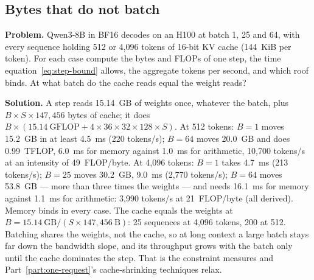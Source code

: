 \subsection{Bytes that do not batch}
\textbf{Problem.} Qwen3-8B in BF16 decodes on an H100 at batch 1, 25 and 64,
with every sequence holding 512 or 4,096 tokens of 16-bit KV cache (144~KiB per
token). For each case compute the bytes and FLOPs of one step, the time
equation~\eqref{eq:step-bound} allows, the aggregate tokens per second, and which
roof binds. At what batch do the cache reads equal the weight reads?

\textbf{Solution.} A step reads 15.14~GB of weights once, whatever the batch,
plus $B \times S \times 147{,}456$ bytes of cache; it does $B \times
(15.14~\text{GFLOP} + 4 \times 36 \times 32 \times 128 \times S)$. At 512 tokens:
$B = 1$ moves 15.2~GB in at least 4.5~ms (220 tokens/s); $B = 64$ moves 20.0~GB
and does 0.99~TFLOP, 6.0~ms for memory against 1.0~ms for arithmetic, 10,700
tokens/s at an intensity of 49~FLOP/byte. At 4,096 tokens: $B = 1$ takes
4.7~ms (213 tokens/s); $B = 25$ moves 30.2~GB, 9.0~ms (2,770 tokens/s); $B = 64$
moves 53.8~GB --- more than three times the weights --- and needs 16.1~ms for
memory against 1.1~ms for arithmetic: 3,990 tokens/s at 21~FLOP/byte (all
derived). Memory binds in every case. The cache equals the weights at
$B = 15.14~\text{GB} / (S \times 147{,}456~\text{B})$: 25 sequences at 4,096
tokens, 200 at 512. Batching shares the weights, not the cache, so at long
context a large batch stays far down the bandwidth slope, and its throughput
grows with the batch only until the cache dominates the step. That is the
constraint  measures and Part~\ref{part:one-request}'s
cache-shrinking techniques relax.
